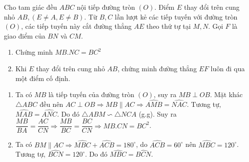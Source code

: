 \begin{bt}%
	Cho tam giác đều $ABC$ nội tiếp đường tròn $(O)$. Điểm $E$ thay đổi trên cung nhỏ $AB, (E \ne A, E \ne B)$. Từ $B, C$ lần lượt kẻ các tiếp tuyến với đường tròn $(O)$, các tiếp tuyến này cắt đường thẳng $AE$ theo thứ tự tại $M,N$. Gọi $F$ là giao điểm của $BN$ và $CM$.
	\begin{enumerate}
		\item Chứng minh $MB.NC=BC^2$
		\item Khi $E$ thay đổi trên cung nhỏ $AB$, chứng minh đường thẳng $EF$ luôn đi qua một điểm cố định.
	\end{enumerate}
	\loigiai
	{
		\begin{center}
		\end{center}
		\begin{enumerate}
			\item Ta có $MB$ là tiếp tuyến của đường tròn $(O)$, suy ra $MB \perp OB$. Mặt khác $\triangle ABC$ đều nên $AC\perp OB \Rightarrow MB \parallel AC \Rightarrow \widehat{AMB}=\widehat{NAC}$. Tương tự, $\widehat{MAB}=\widehat{ANC}$. Do đó $\triangle ABM\backsim \triangle NCA$ (g.g). Suy ra $\dfrac{MB}{BA}=\dfrac{AC}{CN}\Rightarrow \dfrac{MB}{BC}=\dfrac{BC}{CN}\Rightarrow MB.CN=BC^2$.
			\item Ta có $BM \parallel AC \Rightarrow \widehat{MBC}+\widehat{ACB}=180^\circ$, do $\widehat{ACB}=60^\circ$ nên $\widehat{MBC}=120^\circ$.\\
			Tương tự, $\widehat{BCN}=120^\circ$. Do đó $\widehat{MBC}=\widehat{BCN}$.\\

\end{enumerate}}
\end{bt}
